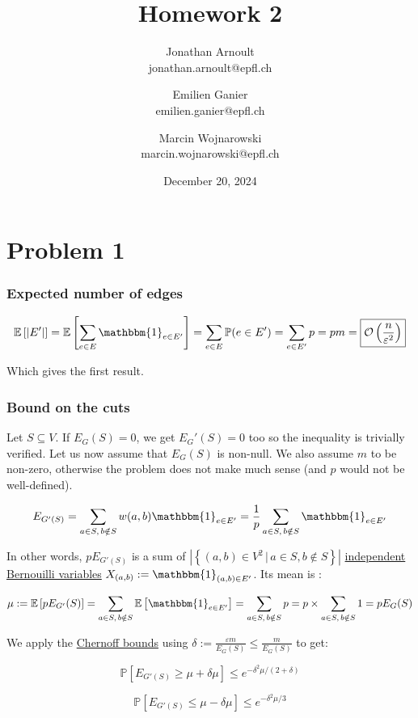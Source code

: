 \documentclass[a4paper, 11pt]{article}
\title{Homework 2}
\author{
    Jonathan Arnoult \\ jonathan.arnoult@epfl.ch
    \and Emilien Ganier \\ emilien.ganier@epfl.ch
    \and Marcin Wojnarowski \\ marcin.wojnarowski@epfl.ch
}
\date{December 20, 2024}
\begin{document}
\maketitle

\section*{Problem 1}

\subsubsection*{Expected number of edges}

$$\mathbb{E}\left[|E'|\right] = \mathbb{E}\left[\sum_{e\in E}\mathbbm{1}_{e \in E'}\right] = \sum_{e\in E}\mathbb{P}(e \in E') = \sum_{e \in E'}p = pm = \boxed{\mathcal{O}\left(\frac{n}{\varepsilon^2}\right)}$$

Which gives the first result.

\subsubsection*{Bound on the cuts}

Let $S \subseteq V$. If $E_G(S) = 0$, we get $E_G'(S) = 0$ too so the inequality is trivially verified. Let us now assume that $E_G(S)$ is non-null. We also assume $m$ to be non-zero, otherwise the problem does not make much sense (and $p$ would not be well-defined).

$$E_{G'(S)} = \sum_{a \in S,\, b \notin S} w(a, b) \mathbbm{1}_{e \in E'} = \frac{1}{p} \sum_{a \in S,\, b \notin S} \mathbbm{1}_{e \in E'}$$

In other words, $p E_{G'(S)}$ is a sum of $|\left\{(a, b) \in V^2 \,|\, a \in S, b \notin S\right\}|$ \ul{independent Bernouilli variables} $X_{(a,b)} := \mathbbm{1}_{(a,b) \in E'}$. Its mean is :

$$\mu := \mathbb{E}\left[ p E_{G'}(S) \right] = \sum_{a \in S,\, b \notin S} \mathbb{E}\left[\mathbbm{1}_{e \in E'}\right] = \sum_{a \in S,\, b \notin S} p = p \times \sum_{a \in S,\, b \notin S} 1 = p E_G(S)$$

We apply the \ul{Chernoff bounds} using $\delta := \frac{\varepsilon m}{E_G(S)} \le \frac{m}{E_G(S)}$ to get:

$$\mathbb{P}\left[E_{G'(S)} \ge \mu + \delta \mu\right] \le e^{-\delta^2\mu/(2+\delta)}$$

$$\mathbb{P}\left[E_{G'(S)} \le \mu - \delta \mu\right] \le e^{-\delta^2\mu/3}$$
\end{document}
